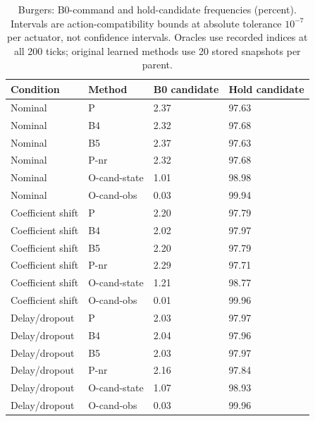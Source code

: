 \begin{table}[ht]
\caption{Burgers: B0-command and hold-candidate frequencies (percent). Intervals are action-compatibility bounds at absolute tolerance $10^{-7}$ per actuator, not confidence intervals. Oracles use recorded indices at all 200 ticks; original learned methods use 20 stored snapshots per parent.}\label{tab:choices_burgers}
\centering\small
\begin{tabular}{@{}llll@{}}\toprule
Condition & Method & B0 candidate & Hold candidate\\\midrule
Nominal & P & 2.37 & 97.63 \\
Nominal & B4 & 2.32 & 97.68 \\
Nominal & B5 & 2.37 & 97.63 \\
Nominal & P-nr & 2.32 & 97.68 \\
Nominal & O-cand-state & 1.01 & 98.98 \\
Nominal & O-cand-obs & 0.03 & 99.94 \\
Coefficient shift & P & 2.20 & 97.79 \\
Coefficient shift & B4 & 2.02 & 97.97 \\
Coefficient shift & B5 & 2.20 & 97.79 \\
Coefficient shift & P-nr & 2.29 & 97.71 \\
Coefficient shift & O-cand-state & 1.21 & 98.77 \\
Coefficient shift & O-cand-obs & 0.01 & 99.96 \\
Delay/dropout & P & 2.03 & 97.97 \\
Delay/dropout & B4 & 2.04 & 97.96 \\
Delay/dropout & B5 & 2.03 & 97.97 \\
Delay/dropout & P-nr & 2.16 & 97.84 \\
Delay/dropout & O-cand-state & 1.07 & 98.93 \\
Delay/dropout & O-cand-obs & 0.03 & 99.96 \\
\bottomrule\end{tabular}
\end{table}
